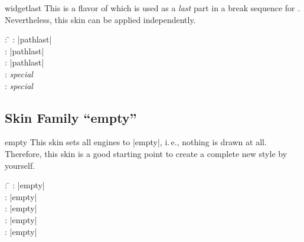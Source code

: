 \clearpage
\begin{docSkin}{widgetlast}
This is a flavor of  which is used as a \emph{last} part
in a break sequence for .
Nevertheless, this skin can be applied independently.
\begin{tcolorbox}[skintable=widgetlast]
  \begin{tabbing}
    : \=\kill
    :           \> |pathlast|\\
    : \> |pathlast|\\ 
    :        \> |pathlast|\\
    :    \> \emph{special}\\
    :           \> \emph{special}
  \end{tabbing}
\end{tcolorbox}
\end{docSkin}


\begin{dispExample}
\end{dispExample}


\clearpage
\subsection{Skin Family \enquote{empty}}

\begin{docSkin}{empty}
  This skin sets all engines to |empty|, i.\,e., nothing is drawn at all.
  Therefore, this skin is a good starting point to create a complete
  new style by yourself.
\begin{tcolorbox}[skintable=empty]
  \begin{tabbing}
    : \=\kill
    :           \> |empty|\\
    : \> |empty|\\ 
    :        \> |empty|\\
    :    \> |empty|\\
    :           \> |empty|
  \end{tabbing}
\end{tcolorbox}
\end{docSkin}


